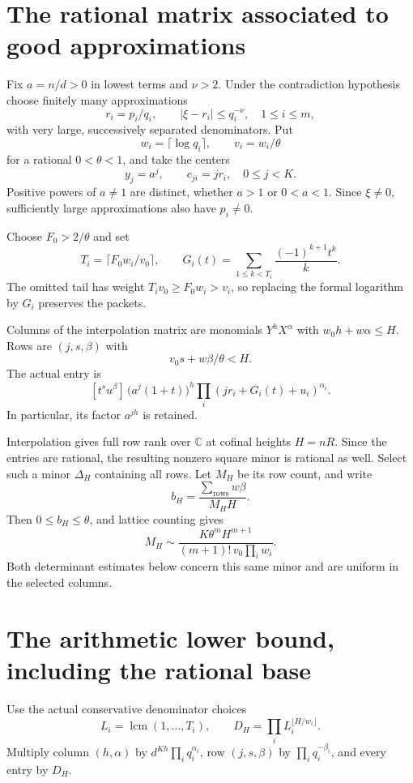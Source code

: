 \section{The rational matrix associated to good approximations}

Fix \(a=n/d>0\) in lowest terms and \(\nu>2\). Under the contradiction hypothesis choose finitely many approximations
\[
r_i=p_i/q_i,\qquad |\xi-r_i|\le q_i^{-\nu},\quad 1\le i\le m,
\]
with very large, successively separated denominators. Put
\[
w_i=\lceil\log q_i\rceil,\qquad v_i=w_i/\theta
\]
for a rational \(0<\theta<1\), and take the centers
\[
y_j=a^j,\qquad c_{ji}=jr_i,\quad 0\le j<K.
\]
Positive powers of \(a\ne1\) are distinct, whether \(a>1\) or \(0<a<1\). Since \(\xi\ne0\), sufficiently large approximations also have \(p_i\ne0\).

Choose \(F_0>2/\theta\) and set
\[
T_i=\lceil F_0w_i/v_0\rceil,\qquad
G_i(t)=\sum_{1\le k<T_i}\frac{(-1)^{k+1}t^k}{k}.
\]
The omitted tail has weight \(T_iv_0\ge F_0w_i>v_i\), so replacing the formal logarithm by \(G_i\) preserves the packets.

Columns of the interpolation matrix are monomials \(Y^hX^\alpha\) with \(w_0h+w\alpha\le H\). Rows are \((j,s,\beta)\) with
\[
v_0s+w\beta/\theta<H.
\]
The actual entry is
\[
[t^su^\beta]\,
\bigl(a^j(1+t)\bigr)^h
\prod_i(jr_i+G_i(t)+u_i)^{\alpha_i}.
\tag{8}
\]
In particular, its factor \(a^{jh}\) is retained.

Interpolation gives full row rank over \(\mathbb C\) at cofinal heights \(H=nR\). Since the entries are rational, the resulting nonzero square minor is rational as well. Select such a minor \(\Delta_H\) containing all rows. Let \(M_H\) be its row count, and write
\[
b_H=\frac{\sum_{\text{rows}}w\beta}{M_HH}.
\]
Then \(0\le b_H\le\theta\), and lattice counting gives
\[
M_H\sim
\frac{K\theta^mH^{m+1}}{(m+1)!\,v_0\prod_iw_i}.
\tag{9}
\]
Both determinant estimates below concern this same minor and are uniform in the selected columns.

\section{The arithmetic lower bound, including the rational base}

Use the actual conservative denominator choices
\[
L_i=\operatorname{lcm}(1,\ldots,T_i),\qquad
D_H=\prod_iL_i^{\lfloor H/w_i\rfloor}.
\]
Multiply column \((h,\alpha)\) by \(d^{Kh}\prod_iq_i^{\alpha_i}\), row \((j,s,\beta)\) by \(\prod_iq_i^{-\beta_i}\), and every entry by \(D_H\).

